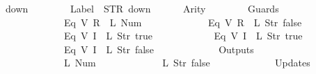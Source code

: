 \begin{isabellebody}
{\isachardoublequoteopen}down{}{}\ {\isasymequiv}\ {\isasymlparr}\isanewline
\ \ \ \ \ \ Label\ {\isacharequal}\ STR\ {\isacharprime}{\isacharprime}down{\isacharprime}{\isacharprime}{\isacharcomma}\isanewline
\ \ \ \ \ \ Arity\ {\isacharequal}\ {}{\isacharcomma}\isanewline
\ \ \ \ \ \ Guards\ {\isacharequal}\ {\isacharbrackleft}\isanewline
\ \ \ \ \ \ \ \ \ \ \ \ {\isacharparenleft}Eq\ {\isacharparenleft}V\ {\isacharparenleft}R\ {}{\isacharparenright}{\isacharparenright}\ {\isacharparenleft}L\ {\isacharparenleft}Num\ {}{\isacharparenright}{\isacharparenright}{\isacharparenright}{\isacharcomma}\isanewline
\ \ \ \ \ \ \ \ \ \ \ \ {\isacharparenleft}Eq\ {\isacharparenleft}V\ {\isacharparenleft}R\ {}{\isacharparenright}{\isacharparenright}\ {\isacharparenleft}L\ {\isacharparenleft}Str\ {\isacharprime}{\isacharprime}false{\isacharprime}{\isacharprime}{\isacharparenright}{\isacharparenright}{\isacharparenright}{\isacharcomma}\isanewline
\ \ \ \ \ \ \ \ \ \ \ \ {\isacharparenleft}Eq\ {\isacharparenleft}V\ {\isacharparenleft}I\ {}{\isacharparenright}{\isacharparenright}\ {\isacharparenleft}L\ {\isacharparenleft}Str\ {\isacharprime}{\isacharprime}true{\isacharprime}{\isacharprime}{\isacharparenright}{\isacharparenright}{\isacharparenright}{\isacharcomma}\isanewline
\ \ \ \ \ \ \ \ \ \ \ \ {\isacharparenleft}Eq\ {\isacharparenleft}V\ {\isacharparenleft}I\ {}{\isacharparenright}{\isacharparenright}\ {\isacharparenleft}L\ {\isacharparenleft}Str\ {\isacharprime}{\isacharprime}true{\isacharprime}{\isacharprime}{\isacharparenright}{\isacharparenright}{\isacharparenright}{\isacharcomma}\isanewline
\ \ \ \ \ \ \ \ \ \ \ \ {\isacharparenleft}Eq\ {\isacharparenleft}V\ {\isacharparenleft}I\ {}{\isacharparenright}{\isacharparenright}\ {\isacharparenleft}L\ {\isacharparenleft}Str\ {\isacharprime}{\isacharprime}false{\isacharprime}{\isacharprime}{\isacharparenright}{\isacharparenright}{\isacharparenright}\isanewline
\ \ \ \ \ \ {\isacharbrackright}{\isacharcomma}\isanewline
\ \ \ \ \ \ Outputs\ {\isacharequal}\ {\isacharbrackleft}\isanewline
\ \ \ \ \ \ \ \ \ \ \ \ {\isacharparenleft}L\ {\isacharparenleft}Num\ {}{\isacharparenright}{\isacharparenright}{\isacharcomma}\isanewline
\ \ \ \ \ \ \ \ \ \ \ \ {\isacharparenleft}L\ {\isacharparenleft}Str\ {\isacharprime}{\isacharprime}false{\isacharprime}{\isacharprime}{\isacharparenright}{\isacharparenright}\isanewline
\ \ \ \ \ \ {\isacharbrackright}{\isacharcomma}\isanewline
\ \ \ \ \ \ Updates\ {\isacharequal}\ {\isacharbrackleft}\isanewline

\end{isabellebody}
